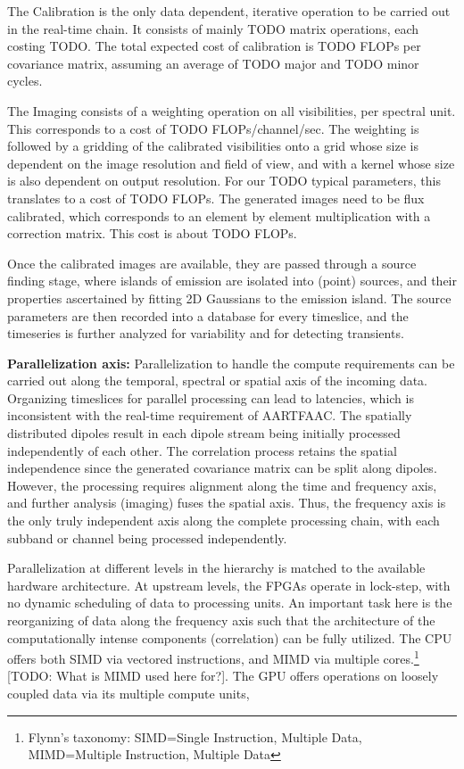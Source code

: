 \documentclass{ws-jai}
\begin{document}
The Calibration  is the only data  dependent, iterative operation to  be carried
out in the  real-time chain. It consists of mainly  TODO matrix operations, each
costing  TODO.  The  total  expected  cost of  calibration  is  TODO  FLOPs  per
covariance matrix, assuming an average of TODO major and TODO minor cycles.

The Imaging consists of a weighting  operation on all visibilities, per spectral
unit. This  corresponds to a  cost of  TODO FLOPs/channel/sec. The  weighting is
followed by a gridding of the calibrated  visibilities onto a grid whose size is
dependent on  the image resolution  and field of view,  and with a  kernel whose
size is  also dependent on output  resolution. For our TODO  typical parameters,
this translates to  a cost of TODO  FLOPs. The generated images need  to be flux
calibrated, which  corresponds to  an element by  element multiplication  with a
correction matrix. This cost is about TODO FLOPs.

Once  the calibrated  images are  available, they  are passed  through a  source
finding stage, where islands of emission  are isolated into (point) sources, and
their properties ascertained by fitting 2D Gaussians to the emission island. The
source parameters are then recorded into a database for every timeslice, and the
timeseries is further analyzed for variability and for detecting transients.

\noindent \textbf  {Parallelization axis:}  Parallelization to handle  the compute
requirements can be carried out along  the temporal, spectral or spatial axis of
the incoming  data.  Organizing timeslices  for parallel processing can  lead to
latencies, which is inconsistent with the real-time requirement of AARTFAAC. The
spatially  distributed dipoles  result  in each  dipole  stream being  initially
processed  independently of  each other.   The correlation  process retains  the
spatial independence  since the generated  covariance matrix can be  split along
dipoles.   However,  the  processing  requires  alignment  along  the  time  and
frequency axis,  and further analysis  (imaging) fuses the spatial  axis.  Thus,
the  frequency axis  is  the  only truly  independent  axis  along the  complete
processing chain, with each subband or channel being processed independently.

Parallelization at different levels in the hierarchy is matched to the available
hardware architecture.  At upstream levels, the FPGAs operate in lock-step, with
no dynamic scheduling of data to processing units. An important task here is the
reorganizing of data along the frequency  axis such that the architecture of the
computationally intense components (correlation) can  be fully utilized. The CPU
offers   both  SIMD   via   vectored  instructions,   and   MIMD  via   multiple
cores.\footnote  {Flynn's  taxonomy:  SIMD=Single  Instruction,  Multiple  Data,
  MIMD=Multiple Instruction, Multiple Data} [TODO: What is MIMD used here for?]. The GPU offers operations on loosely coupled data via its multiple compute units, 
\end{document}
